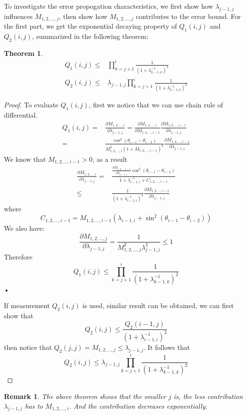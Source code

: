 \documentclass[conference]{IEEEtran}
\newtheorem{theorem}{Theorem}
\newtheorem{remark}{Remark}
\begin{document}
To investigate the error propogation characteristics, we first show how $\lambda_{j-1,j}$ influences $M_{1,2,\dots,j}$, then show how $M_{1,2,\dots,j}$ contributes to the error bound. 
For the first part, we get the exponential decaying property of $Q_1(i,j)$ and $Q_2(i,j)$, summarized in the following theorem:
\begin{theorem}
\begin{align}
Q_1(i,j) \leq & \prod_{k=j+1}^i \frac{1}{(1+\lambda_{k-1,k}^{-1})^2}\nonumber\\
Q_2(i,j) \leq & \lambda_{j-1,j}\prod_{k=j+1}^i \frac{1}{(1+\lambda_{k-1,k}^{-1})^2}
\end{align}
\end{theorem}
\begin{proof}
To evaluate $Q_1(i,j)$, first we notice that we can use chain rule of differential.
\begin{align}
Q_1(i,j)=&\frac{\partial M_{1,2,\dots,i}}{\partial \lambda_{j-1,j}}=\frac{\partial M_{1,2,\dots,i}}{\partial M_{1,2,\dots,i-1}}
\frac{\partial M_{1,2,\dots,i-1}}{\partial \lambda_{j-1,j}}\nonumber\\
=&\frac{\cos^2(\theta_{i-1}-\theta_{i-2})}{M_{1,2,\dots,i}^2(1+M_{1,2,\dots,i-1})^2}\frac{\partial M_{1,2,\dots,i-1}}{\partial \lambda_{j-1,j}}
\end{align}
We know that $M_{1,2,\dots,i-1}>0$, as a result
\begin{align}
\frac{\partial M_{1,2,\dots,i}}{\partial \lambda_{j-1,j}} = &  \frac{\frac{\partial M_{1,2,\dots,i-1}}{\partial \lambda_{j-1,j}}\cos^2(\theta_{i-1}-\theta_{i-2})}
{
1+\lambda_{i-1,i}^{-1}+C_{1,2,\dots,i-1}
}
\nonumber\\
\leq &\frac{1}{(1+\lambda_{i-1,i}^{-1})^2}\frac{\partial M_{1,2,\dots,i-1}}{\partial \lambda_{j-1,j}} 
\end{align}
where
\begin{equation*}
C_{1,2,\dots,i-1}=M_{1,2,\dots,i-1}(\lambda_{i-1,i}+\sin^2(\theta_{i-1}-\theta_{i-2}))
\end{equation*}
We also have:
\[
\frac{\partial M_{1,2,\dots,j}}{\partial \lambda_{j-1,j}}=\frac{1}{M_{1,2,\dots,j}^2 \lambda_{j-1,j}^2}\leq 1
\]
Therefore
\begin{equation}
Q_1(i,j) \leq \prod_{k=j+1}^i \frac{1}{(1+\lambda_{k-1,k}^{-1})^2}
\end{equation}•

If measurement $Q_2(i,j)$ is used, similar result can be obtained, we can first show that
\begin{equation}
Q_2(i,j)\leq \frac{Q_2(i-1,j)}{(1+\lambda_{i-1,i}^{-1})^2}
\end{equation}
then notice that $Q_2(j,j)=M_{1,2,\dots,j}\leq \lambda_{j-1,j}$. It follows that
\begin{equation}
Q_2(i,j) \leq \lambda_{j-1,j}\prod_{k=j+1}^i \frac{1}{(1+\lambda_{k-1,k}^{-1})^2}
\end{equation}
\end{proof}
\begin{remark}
The above theorem shows that the smaller $j$ is, 
the less contribution $\lambda_{j-1,j}$ has to $M_{1,2,\dots,i}$.  And the contribution decreases exponentially.
\end{remark}
\end{document}
